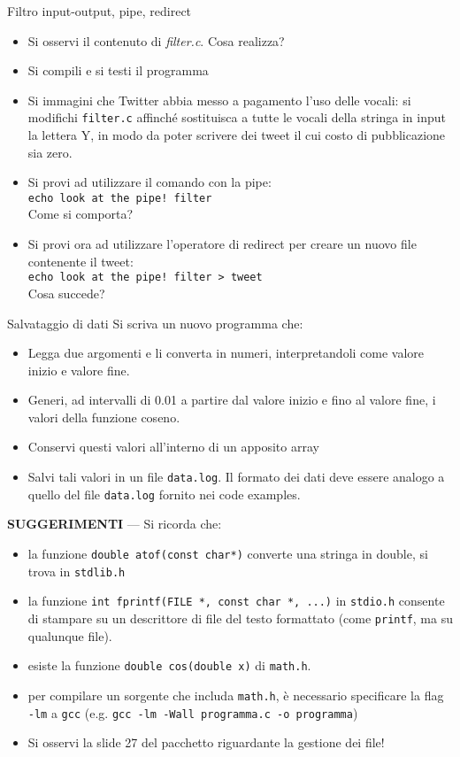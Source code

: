 \documentclass{beamer}
\begin{document}
\begin{frame}[fragile]{Filtro input-output, pipe, redirect}
\begin{itemize}
 \item Si osservi il contenuto di \emph{filter.c}. Cosa realizza?
 \item Si compili e si testi il programma
 \item Si immagini che Twitter abbia messo a pagamento l'uso delle vocali: si modifichi \texttt{filter.c} affinché sostituisca a tutte le vocali della stringa in input la lettera Y, in modo da poter scrivere dei tweet il cui costo di pubblicazione sia zero.
 \item Si provi ad utilizzare il comando con la pipe: \\ \texttt{echo look at the pipe! \textbar{} filter} \\ Come si comporta?
 \item Si provi ora ad utilizzare l'operatore di redirect per creare un nuovo file contenente il tweet: \\ \texttt{echo look at the pipe! \textbar{} filter > tweet} \\ Cosa succede?
\end{itemize}
\end{frame}

\begin{frame}[fragile]{Salvataggio di dati}
Si scriva un nuovo programma che:
\begin{itemize}
 \item Legga due argomenti e li converta in numeri, interpretandoli come valore inizio e valore fine.
 \item Generi, ad intervalli di 0.01 a partire dal valore inizio e fino al valore fine, i valori della funzione coseno.
 \item Conservi questi valori all'interno di un apposito array
 \item Salvi tali valori in un file \texttt{data.log}. Il formato dei dati deve essere analogo a quello del file \texttt{data.log} fornito nei code examples.
\end{itemize}
\scriptsize
\textbf{SUGGERIMENTI} --- Si ricorda che:
\begin{itemize}
 \item la funzione \texttt{double atof(const char*)} converte una stringa in double, si trova in \texttt{stdlib.h}
 \item la funzione \texttt{int fprintf(FILE *, const char *, ...)} in \texttt{stdio.h} consente di stampare su un descrittore di file del testo formattato (come \texttt{printf}, ma su qualunque file).
 \item esiste la funzione \texttt{double cos(double x)} di \texttt{math.h}.
 \item per compilare un sorgente che includa \texttt{math.h}, è necessario specificare la flag \texttt{-lm} a \texttt{gcc} (e.g. \texttt{gcc -lm -Wall programma.c -o programma})
 \item Si osservi la slide 27 del pacchetto riguardante la gestione dei file!
\end{itemize}
\end{frame}
\end{document}
